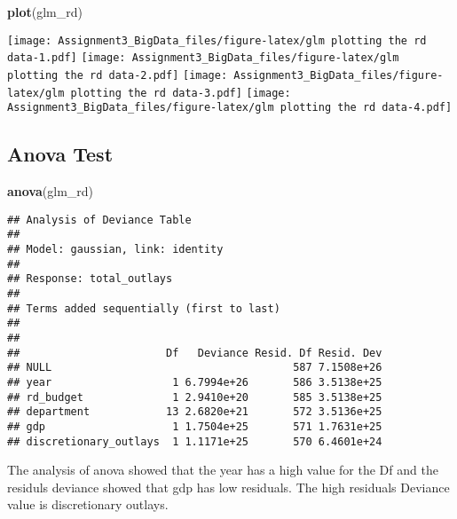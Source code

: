 \documentclass[]{article}
\newenvironment{Shaded}{\begin{snugshade}}{\end{snugshade}}
\newcommand{\KeywordTok}[1]{\textcolor[rgb]{0.13,0.29,0.53}{\textbf{#1}}}
\newcommand{\NormalTok}[1]{#1}
\begin{document}
\begin{Shaded}
\begin{Highlighting}[]
\KeywordTok{plot}\NormalTok{(glm_rd)}
\end{Highlighting}
\end{Shaded}

\texttt{[image: Assignment3\_BigData\_files/figure-latex/glm plotting the rd data-1.pdf]}
\texttt{[image: Assignment3\_BigData\_files/figure-latex/glm plotting the rd data-2.pdf]}
\texttt{[image: Assignment3\_BigData\_files/figure-latex/glm plotting the rd data-3.pdf]}
\texttt{[image: Assignment3\_BigData\_files/figure-latex/glm plotting the rd data-4.pdf]}

\subsection{Anova Test}\label{anova-test-1}

\begin{Shaded}
\begin{Highlighting}[]
\KeywordTok{anova}\NormalTok{(glm_rd)}
\end{Highlighting}
\end{Shaded}

\begin{verbatim}
## Analysis of Deviance Table
## 
## Model: gaussian, link: identity
## 
## Response: total_outlays
## 
## Terms added sequentially (first to last)
## 
## 
##                       Df   Deviance Resid. Df Resid. Dev
## NULL                                      587 7.1508e+26
## year                   1 6.7994e+26       586 3.5138e+25
## rd_budget              1 2.9410e+20       585 3.5138e+25
## department            13 2.6820e+21       572 3.5136e+25
## gdp                    1 1.7504e+25       571 1.7631e+25
## discretionary_outlays  1 1.1171e+25       570 6.4601e+24
\end{verbatim}

The analysis of anova showed that the year has a high value for the Df
and the residuls deviance showed that gdp has low residuals. The high
residuals Deviance value is discretionary outlays.
\end{document}
